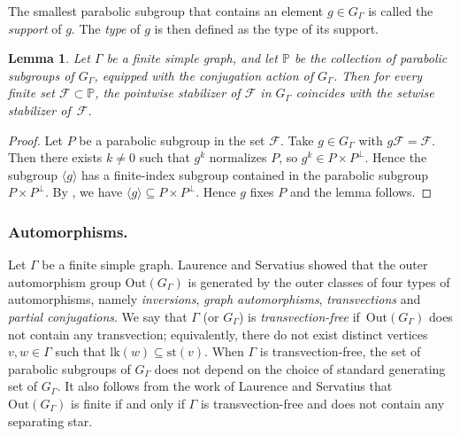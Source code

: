 \documentclass[11pt]{article}
\numberwithin{equation}{section}
\let\mathcal\mathscr
\theoremstyle{plain}
\newtheorem{lemma}[theo]{Lemma}
\theoremstyle{definition}
\newcommand{\calf}{\mathcal{F}}
\newcommand{\lk}{\mathrm{lk}}
\newcommand{\Out}{\mathrm{Out}}
\newcommand{\st}{\mathrm{st}}
\begin{document}
The smallest parabolic subgroup that contains an element $g\in G_\Gamma$ is called the \emph{support} of $g$. The \emph{type} of $g$ is then defined as the type of its support.\enlargethispage{.9\baselineskip}%

\begin{lemma}
\label{lemma:setwise vs pointwise}
Let $\Gamma$ be a finite simple graph, and let $\mathbb P$ be the collection of parabolic subgroups of $G_\Gamma$, equipped with the conjugation action of $G_\Gamma$. Then for every finite set $\calf\! \subset\! \mathbb P$, the pointwise stabilizer of $\calf$ in $G_\Gamma$ coincides with the setwise stabilizer of~$\calf$.
\end{lemma}

\begin{proof}
Let $P$ be a parabolic subgroup in the set $\calf$. Take $g\!\in\! G_\Gamma$ with \hbox{$g\calf\!=\!\calf$}. Then there exists $k\!\neq\! 0$ such that $g^k$ normalizes $P$, so $g^k\!\in\! P\times P^\perp$. Hence the sub\-group $\langle g\rangle$ has a finite-index subgroup contained in the parabolic subgroup \hbox{$P\!\times\! P^\perp$}. By \cite[Lem.\,6.4]{minasyan2012hereditary}, we have $\langle g\rangle\subseteq P\times P^\perp$. Hence $g$ fixes $P$ and the lemma follows.
\end{proof}

\subsubsection*{Automorphisms.} Let $\Gamma$ be a finite simple graph. Laurence \cite{laurence1995generating} and Servatius \cite{Ser} showed that the outer automorphism group $\Out(G_\Gamma)$ is generated by the outer classes of four types of automorphisms, namely \emph{inversions}, \emph{graph automorphisms}, \emph{transvections} and \emph{partial conjugations}. We say that $\Gamma$ (or $G_\Gamma$) is \emph{transvection-free} if~$\Out(G_\Gamma)$ does not contain any transvection; equivalently, there do not exist distinct vertices $v,w\in\Gamma$ such that $\lk(w)\subseteq \st(v)$. When $\Gamma$ is transvection-free, the set of parabolic subgroups of $G_\Gamma$ does not depend on the choice of standard generating set of $G_\Gamma$. It also follows from the work of Laurence and Servatius that $\Out(G_\Gamma)$ is finite if and only if $\Gamma$ is transvection-free and does not contain any separating star.
\end{document}
